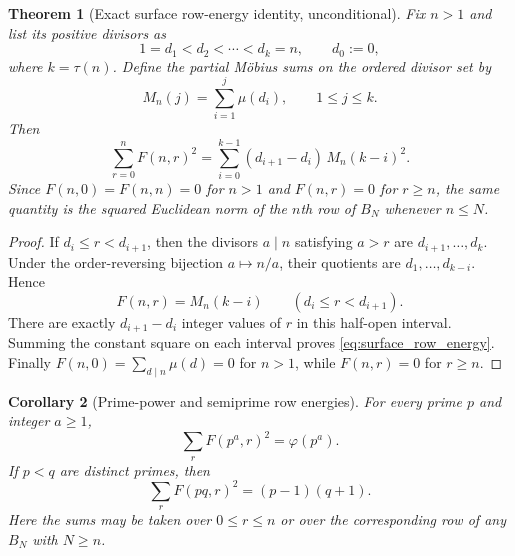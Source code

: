 \documentclass[11pt]{amsart}
\numberwithin{equation}{section}
\theoremstyle{plain}
\newtheorem{theorem}{Theorem}[section]
\newtheorem{corollary}[theorem]{Corollary}
\theoremstyle{definition}
\theoremstyle{remark}
\newcommand{\mob}{\mu}
\newcommand{\Fsurf}{F}
\begin{document}
\begin{theorem}[Exact surface row-energy identity, unconditional]
\label{thm:surface_row_energy}
Fix $n>1$ and list its positive divisors as
\begin{equation}
1=d_1<d_2<\cdots<d_k=n,
\qquad d_0:=0,
\label{eq:ordered_divisors_row}
\end{equation}
where $k=\tau(n)$.  Define the partial Möbius sums on the ordered divisor set by
\begin{equation}
M_n(j)=\sum_{i=1}^{j}\mob(d_i),
\qquad 1\le j\le k.
\label{eq:Mn_divisor_partial}
\end{equation}
Then
\begin{equation}
\sum_{r=0}^{n}\Fsurf(n,r)^2
=\sum_{i=0}^{k-1}(d_{i+1}-d_i)\,M_n(k-i)^2.
\label{eq:surface_row_energy}
\end{equation}
Since $\Fsurf(n,0)=\Fsurf(n,n)=0$ for $n>1$ and $\Fsurf(n,r)=0$ for $r\ge n$, the same quantity is the squared Euclidean norm of the $n$th row of $B_N$ whenever $n\le N$.
\end{theorem}

\begin{proof}
If $d_i\le r<d_{i+1}$, then the divisors $a\mid n$ satisfying $a>r$ are $d_{i+1},\ldots,d_k$.  Under the order-reversing bijection $a\mapsto n/a$, their quotients are $d_1,\ldots,d_{k-i}$.  Hence
\begin{equation}
\Fsurf(n,r)=M_n(k-i)
\qquad(d_i\le r<d_{i+1}).
\label{eq:F_piecewise_Mn}
\end{equation}
There are exactly $d_{i+1}-d_i$ integer values of $r$ in this half-open interval.  Summing the constant square on each interval proves \eqref{eq:surface_row_energy}.  Finally $\Fsurf(n,0)=\sum_{d\mid n}\mob(d)=0$ for $n>1$, while $\Fsurf(n,r)=0$ for $r\ge n$.
\end{proof}

\begin{corollary}[Prime-power and semiprime row energies]
\label{cor:row_energy_special_cases}
For every prime $p$ and integer $a\ge1$,
\begin{equation}
\sum_r\Fsurf(p^a,r)^2=\varphi(p^a).
\label{eq:prime_power_row_energy}
\end{equation}
If $p<q$ are distinct primes, then
\begin{equation}
\sum_r\Fsurf(pq,r)^2=(p-1)(q+1).
\label{eq:semiprime_row_energy}
\end{equation}
Here the sums may be taken over $0\le r\le n$ or over the corresponding row of any $B_N$ with $N\ge n$.
\end{corollary}
\end{document}
